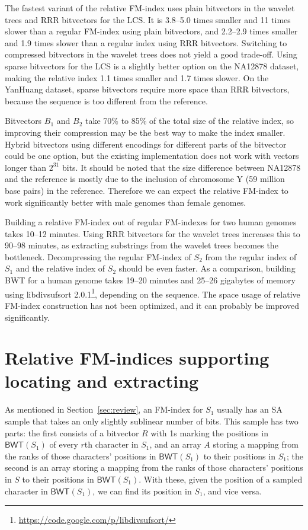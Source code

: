\documentclass{llncs}
\newcommand{\BWT}
  {\ensuremath{\mathsf{BWT}}}
\begin{document}
The fastest variant of the relative FM-index uses plain bitvectors in the
wavelet trees and RRR bitvectors for the LCS. It is 3.8--5.0 times smaller
and 11 times slower than a regular FM-index using plain bitvectors, and
2.2--2.9 times smaller and 1.9 times slower than a regular index using RRR
bitvectors. Switching to compressed bitvectors in the wavelet trees does not
yield a good trade-off. Using sparse bitvectors for the LCS is a slightly
better option on the NA12878 dataset, making the relative index 1.1 times
smaller and 1.7 times slower. On the YanHuang dataset, sparse bitvectors
require more space than RRR bitvectors, because the sequence is too different
from the reference.

Bitvectors $B_{1}$ and $B_{2}$ take 70\% to 85\% of the total size of the
relative index, so improving their compression may be the best way to make the index smaller.
Hybrid bitvectors using different encodings for different
parts of the bitvector~\cite{Kaerkkaeinen2014} could be one option, but
the existing implementation does not work with vectors longer than $2^{31}$
bits. It should be noted that the size difference between NA12878 and the reference is mostly due to the inclusion of chromosome Y (59 million base pairs) in the reference. Therefore we can expect the relative FM-index to work significantly better with male genomes than female genomes.

Building a relative FM-index out of regular FM-indexes for two human genomes
takes 10--12 minutes. Using RRR bitvectors for the wavelet trees increases
this to 90--98 minutes, as extracting substrings from the wavelet trees
becomes the bottleneck. Decompressing the regular FM-index of $S_{2}$ from
the regular index of $S_{1}$ and the relative index of $S_{2}$ should be even
faster. As a comparison, building BWT for a human genome takes 19--20
minutes and 25--26 gigabytes of memory using libdivsufsort
2.0.1\footnote{\url{https://code.google.com/p/libdivsufsort/}}, depending on
the sequence. The space usage of relative FM-index construction has not been
optimized, and it can probably be improved significantly.


\section{Relative FM-indices supporting locating and extracting}
\label{sec:djamal&giovanni}


As mentioned in Section~\ref{sec:review}, an FM-index for $S_1$ usually has
an SA sample that takes an only slightly sublinear number of bits.  This
sample has two parts: the first consists of a bitvector $R$ with 1s marking
the positions in \(\BWT (S_1)\) of every $r$th character in $S_1$, and an
array $A$ storing a mapping from the ranks of those characters' positions in
\(\BWT (S_1)\) to their positions in $S_1$; the second is an array storing a
mapping from the ranks of those characters' positions in $S$ to their
positions in \(\BWT (S_1)\).  With these, given the position of a sampled
character in \(\BWT (S_1)\), we can find its position in $S_1$, and vice
versa.
\end{document}
